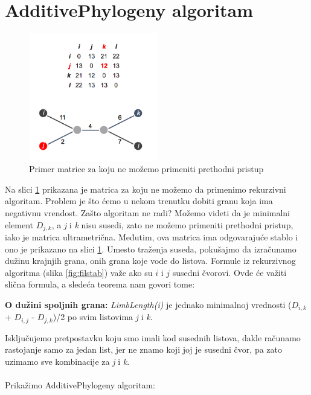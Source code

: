 \section{AdditivePhylogeny algoritam}
\label{addalg}

\begin{figure}[h!]
\begin{center}
\includegraphics[width=0.5\textwidth]{poglavlja/7/slike/slika6.png}
\end{center}
\caption{Primer matrice za koju ne mo\v{z}emo primeniti prethodni pristup}
\label{fig:pmzknppp}
\end{figure}

Na slici \ref{fig:pmzknppp} prikazana je matrica za koju ne možemo da primenimo rekurzivni algoritam. Problem je što ćemo u nekom trenutku dobiti granu koja ima negativnu vrendost. Zašto algoritam ne radi? Mo\v{z}emo videti da je minimalni element $D_{j,k}$, a \textit{j} i \textit{k} nisu susedi, zato ne mo\v{z}emo primeniti prethodni pristup, iako je matrica ultrametri\v{c}na. Međutim, ova matrica ima odgovarajuće stablo i ono je prikazano na slici \ref{fig:pmzknppp}. Umesto tra\v{z}enja suseda, poku\v{s}ajmo da izra\v{c}unamo du\v{z}inu krajnjih grana, onih grana koje vode do listova. Formule iz rekurzivnog algoritma (slika \ref{fig:filstab}) važe ako su $i$ i $j$ susedni čvorovi. Ovde će važiti slična formula, a sledeća teorema nam govori tome:

\begin{teorema}
	\label{teorem:limb}
\textbf{O du\v{z}ini spoljnih grana:} \textit{LimbLength(i)} je jednako minimalnoj vrednosti ($D_{i, k}$ + $D_{i, j}$ - $D_{j, k}$)/2 po svim listovima \textit{j} i \textit{k}.
\end{teorema}

Isklju\v{c}ujemo pretpostavku koju smo imali kod susednih listova, dakle ra\v{c}unamo rastojanje samo za jedan list, jer ne znamo koji joj je susedni \v{c}vor, pa zato uzimamo sve kombinacije za \textit{j} i \textit{k}. 
\\
\\
\noindent Prika\v{z}imo AdditivePhylogeny algoritam:

